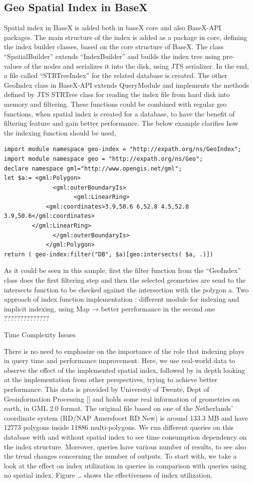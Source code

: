 \documentclass[a4paper,12pt]{article}
\begin{document}
\subsection{Geo Spatial Index in BaseX}
Spatial index in BaseX is added both in baseX core and also BaseX-API packages. The main structure of the index is added as a package in core, defining the index builder classes, based on the core structure of BaseX. The class “SpatialBuilder” extends “IndexBuilder” and builds the index tree using pre-values of the nodes and serializes it into the disk, using JTS serializer. In the end, a file called “STRTreeIndex” for the related database is created. 
The other GeoIndex class in BaseX-API extends QueryModule and implements the methods defined by JTS STRTree class for reading the index file from hard disk into memory and filtering. These functions could be combined with regular geo functions, when spatial index is created for a database, to have the benefit of filtering feature and gain better performance. The below example clarifies how the indexing function should be used,
\begin{verbatim}
import module namespace geo-index = "http://expath.org/ns/GeoIndex";
import module namespace geo = "http://expath.org/ns/Geo";
declare namespace gml="http://www.opengis.net/gml";
let $a:= <gml:Polygon>
              <gml:outerBoundaryIs>
                	<gml:LinearRing> 
			<gml:coordinates>3.9,50.6 6,52.8 4.5,52.8 3.9,50.6</gml:coordinates> 
		</gml:LinearRing>
              </gml:outerBoundaryIs>
            </gml:Polygon>
return ( geo-index:filter("DB", $a)[geo:intersects( $a, .)])
\end{verbatim}
As it could be seen in this sample, first the filter function from the “GeoIndex” class does the first  filtering step and then the selected geometries are send to the intersects function to be checked against the intersection with the polygon a.  
Two approach of index function implementation : different module for indexing and implicit indexing, using Map → better perrformance in the second one  ??????????????

Time Complexity Issues

There is no need to emphasize on the importance of the role that indexing plays in query time and performance improvement. Here, we use real-world data to observe the effect of the implemented spatial index, followed by in depth looking at the implementation from other perspectives, trying to achieve better performance. This data is provided by University of Twente, Dept of Geoinformation Processing [] and holds some real information of geometries on earth, in GML 2.0 format. The original file based on one of the Netherlands' coordinate system (RD/NAP Amersfoort RD New) is around 133.3 MB and have 12773 polygons inside 11886 multi-polygons.
We run different queries on this database with and without spatial index to see time consumption dependency on the index structure. Moreover, queries have various number of results, to see also the trend changes concerning the number of outputs.
To start with, we take a look at the effect on index utilization in queries in comparison with queries using no spatial index. Figure … shows the effectiveness of index utilization.
\end{document}
